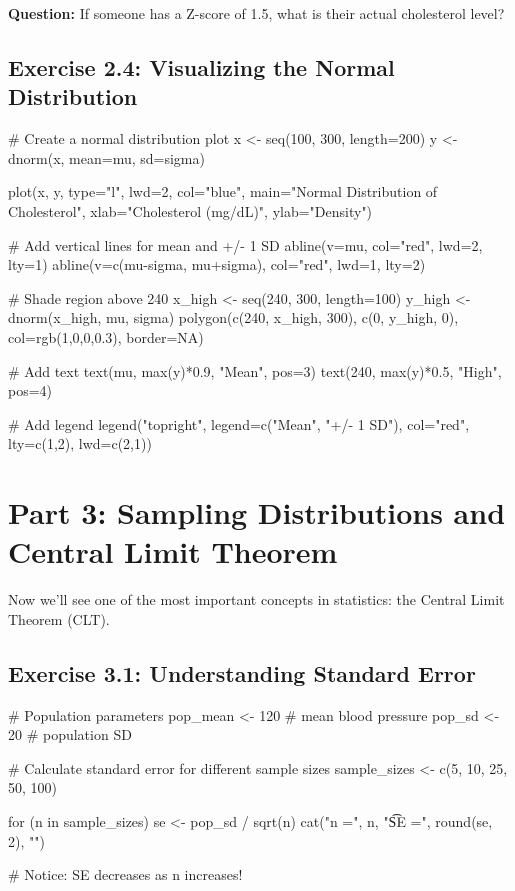 \documentclass[11pt]{article}
\begin{document}
\textbf{Question:} If someone has a Z-score of 1.5, what is their actual cholesterol level?

\vspace{1.5cm}

\subsection{Exercise 2.4: Visualizing the Normal Distribution}

\begin{rcode}
# Create a normal distribution plot
x <- seq(100, 300, length=200)
y <- dnorm(x, mean=mu, sd=sigma)

plot(x, y, type="l", lwd=2, col="blue",
     main="Normal Distribution of Cholesterol",
     xlab="Cholesterol (mg/dL)",
     ylab="Density")

# Add vertical lines for mean and +/- 1 SD
abline(v=mu, col="red", lwd=2, lty=1)
abline(v=c(mu-sigma, mu+sigma), col="red", lwd=1, lty=2)

# Shade region above 240
x_high <- seq(240, 300, length=100)
y_high <- dnorm(x_high, mu, sigma)
polygon(c(240, x_high, 300), c(0, y_high, 0),
        col=rgb(1,0,0,0.3), border=NA)

# Add text
text(mu, max(y)*0.9, "Mean", pos=3)
text(240, max(y)*0.5, "High\nCholesterol", pos=4)

# Add legend
legend("topright",
       legend=c("Mean", "+/- 1 SD"),
       col="red",
       lty=c(1,2),
       lwd=c(2,1))
\end{rcode}

\section{Part 3: Sampling Distributions and Central Limit Theorem}

Now we'll see one of the most important concepts in statistics: the Central Limit Theorem (CLT).

\subsection{Exercise 3.1: Understanding Standard Error}

\begin{rcode}
# Population parameters
pop_mean <- 120        # mean blood pressure
pop_sd <- 20           # population SD

# Calculate standard error for different sample sizes
sample_sizes <- c(5, 10, 25, 50, 100)

for (n in sample_sizes) {
  se <- pop_sd / sqrt(n)
  cat("n =", n, "\t SE =", round(se, 2), "\n")
}

# Notice: SE decreases as n increases!
\end{rcode}
\end{document}
